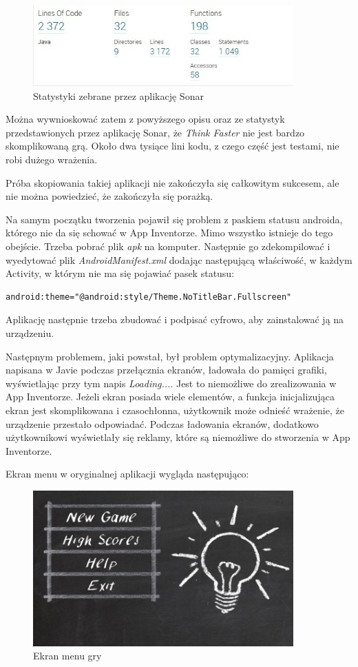 \begin{figure}[H]
\centering\includegraphics[width=10cm]{figures/sonarThinkFaster}
\caption{Statystyki zebrane przez aplikację Sonar}
\end{figure}

Można wywnioskować zatem z powyższego opisu oraz ze statystyk przedstawionych przez aplikację Sonar, że \emph{Think Faster} nie jest bardzo skomplikowaną grą. Około dwa tysiące lini kodu, z czego część jest testami, nie robi dużego wrażenia.

Próba skopiowania takiej aplikacji nie zakończyła się całkowitym sukcesem, ale nie można powiedzieć, że zakończyła się porażką.

Na samym początku tworzenia pojawił się problem z paskiem statusu androida, którego nie da się schować w App Inventorze. Mimo wszystko istnieje do tego obejście. Trzeba pobrać plik \emph{apk} na komputer. Następnie go zdekompilować i wyedytować plik \emph{AndroidManifest.xml} dodając następującą właściwość, w każdym Activity, w którym nie ma się pojawiać pasek statusu:
\begin{lstlisting}
android:theme="@android:style/Theme.NoTitleBar.Fullscreen"
\end{lstlisting}
Aplikację następnie trzeba zbudować i podpisać cyfrowo, aby zainstalować ją na urządzeniu.

Następnym problemem, jaki powstał, był problem optymalizacyjny. Aplikacja napisana w Javie podczas przełącznia ekranów, ładowała do pamięci grafiki, wyświetlając przy tym napis \emph{Loading...}. Jest to niemożliwe do zrealizowania w App Inventorze. Jeżeli ekran posiada wiele elementów, a funkcja inicjalizująca ekran jest skomplikowana i czasochłonna, użytkownik może odnieść wrażenie, że urządzenie przestało odpowiadać. Podczas ładowania ekranów, dodatkowo użytkownikowi wyświetlały się reklamy, które są niemożliwe do stworzenia w App Inventorze.

Ekran menu w oryginalnej aplikacji wygląda następująco:

\begin{figure}[H]
\centering\includegraphics[width=10cm]{figures/apps/thinkfaster_menu}
\caption{Ekran menu gry}
\end{figure}


